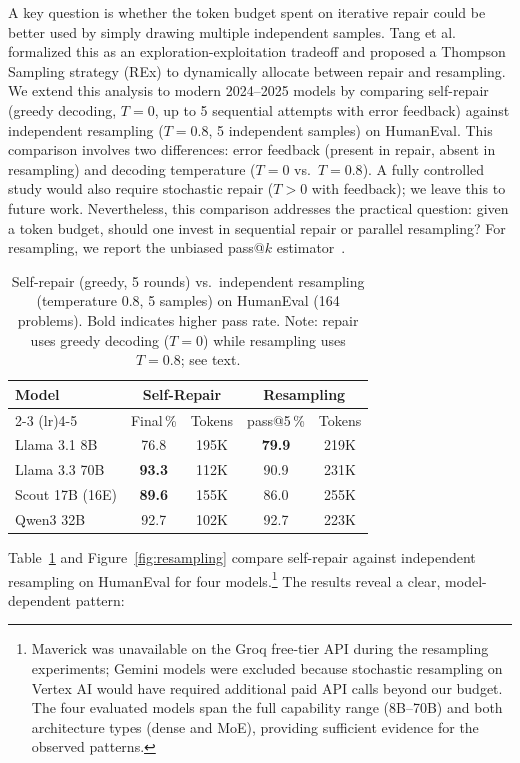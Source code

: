 \documentclass[conference]{IEEEtran}
\begin{document}
A key question is whether the token budget spent on iterative repair could be better used by simply drawing multiple independent samples. Tang et al.~\cite{tang2024repair} formalized this as an exploration-exploitation tradeoff and proposed a Thompson Sampling strategy (REx) to dynamically allocate between repair and resampling. We extend this analysis to modern 2024--2025 models by comparing self-repair (greedy decoding, $T\!=\!0$, up to 5 sequential attempts with error feedback) against independent resampling ($T\!=\!0.8$, 5 independent samples) on HumanEval. This comparison involves two differences: error feedback (present in repair, absent in resampling) and decoding temperature ($T\!=\!0$ vs.\ $T\!=\!0.8$). A fully controlled study would also require stochastic repair ($T\!>\!0$ with feedback); we leave this to future work. Nevertheless, this comparison addresses the practical question: given a token budget, should one invest in sequential repair or parallel resampling? For resampling, we report the unbiased pass@$k$ estimator~\cite{chen2021evaluating}.

\begin{table}[t]
\centering
\caption{Self-repair (greedy, 5 rounds) vs.\ independent resampling (temperature 0.8, 5 samples) on HumanEval (164 problems). Bold indicates higher pass rate. Note: repair uses greedy decoding ($T\!=\!0$) while resampling uses $T\!=\!0.8$; see text.}
\label{tab:resampling}
\begin{tabular}{lcccc}
\toprule
\textbf{Model} & \multicolumn{2}{c}{\textbf{Self-Repair}} & \multicolumn{2}{c}{\textbf{Resampling}} \\
\cmidrule(lr){2-3} \cmidrule(lr){4-5}
 & Final\,\% & Tokens & pass@5\,\% & Tokens \\
\midrule
Llama 3.1 8B    & 76.8 & 195K & \textbf{79.9} & 219K \\
Llama 3.3 70B   & \textbf{93.3} & 112K & 90.9 & 231K \\
Scout 17B (16E) & \textbf{89.6} & 155K & 86.0 & 255K \\
Qwen3 32B       & 92.7 & 102K & 92.7 & 223K \\
\bottomrule
\end{tabular}
\end{table}

Table~\ref{tab:resampling} and Figure~\ref{fig:resampling} compare self-repair against independent resampling on HumanEval for four models.\footnote{Maverick was unavailable on the Groq free-tier API during the resampling experiments; Gemini models were excluded because stochastic resampling on Vertex AI would have required additional paid API calls beyond our budget. The four evaluated models span the full capability range (8B--70B) and both architecture types (dense and MoE), providing sufficient evidence for the observed patterns.} The results reveal a clear, model-dependent pattern:
\end{document}
